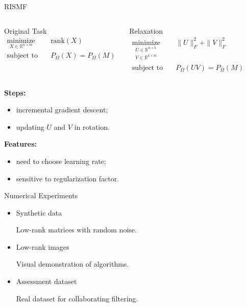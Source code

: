 \documentclass{beamer}
\begin{document}
\begin{frame}{RISMF}
	\begin{columns}[c]
		\begin{block}{Original Task}
			\vspace{-0.5cm}
			\begin{align*}
			\mathop{\text{minimize}}\limits_{X \in \mathbb{R}^{n \times m}} \quad & 
			\text{rank} (X) \\
			\text{subject to} \quad & P_{\Omega} (X) = P_{\Omega} (M)
			\end{align*}
		\end{block}
		
		\begin{block}{Relaxation}
			\vspace{-0.5cm}
			\begin{align*}
			\mathop{\text{minimize}}\limits_{\substack{	U \in \mathbb{R}^{n \times k} \\ V \in \mathbb{R}^{k \times m}}} \quad & \| U \|^2_F + \| V \|^2_F \\
			\text{subject to} \quad &  P_{\Omega} (UV) = P_{\Omega} (M) 
			\end{align*}
		\end{block}
	\end{columns}
	\vspace{0.3cm}
	\textbf{Steps:}
	\begin{itemize}
		\item incremental gradient descent;
		\item updating $U$ and $V$ in rotation.
	\end{itemize}	
	\vspace{0.3cm}
	\textbf{Features:}
	\begin{itemize}
		\item need to choose learning rate;
		\item sensitive to regularization factor.
	\end{itemize}

\end{frame}
\begin{frame}{Numerical Experiments}
\begin{itemize}
	\item Synthetic data
	
	Low-rank matrices with random noise.
	\item Low-rank images
	
	Visual demonstration of algorithms.
	\item Assessment dataset
	
	Real dataset for collaborating filtering.
\end{itemize}

\end{frame}
\end{document}
